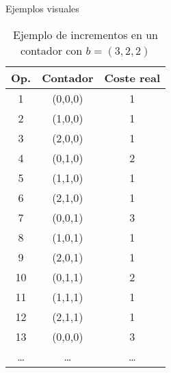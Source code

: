 \documentclass[aspectratio=169]{beamer}
\begin{document}
\begin{frame}{Ejemplos visuales}
    \begin{table}
        \centering
    {\footnotesize
        \begin{tabular}{|c|c|c|}
            \hline
            	\textbf{Op.} & \textbf{Contador} & \textbf{Coste real} \\
            \hline
            1 & (0,0,0) & 1 \\
            2 & (1,0,0) & 1 \\
            3 & (2,0,0) & 1 \\
            4 & (0,1,0) & 2 \\
            5 & (1,1,0) & 1 \\
            6 & (2,1,0) & 1 \\
            7 & (0,0,1) & 3 \\
            8 & (1,0,1) & 1 \\
            9 & (2,0,1) & 1 \\
            10 & (0,1,1) & 2 \\
            11 & (1,1,1) & 1 \\
            12 & (2,1,1) & 1 \\
            13 & (0,0,0) & 3 \\
            \ldots & \ldots & \ldots \\
            \hline
        \end{tabular}
        }
        \caption{Ejemplo de incrementos en un contador con $b = (3,2,2)$}
    \end{table}
\end{frame}
\end{document}
